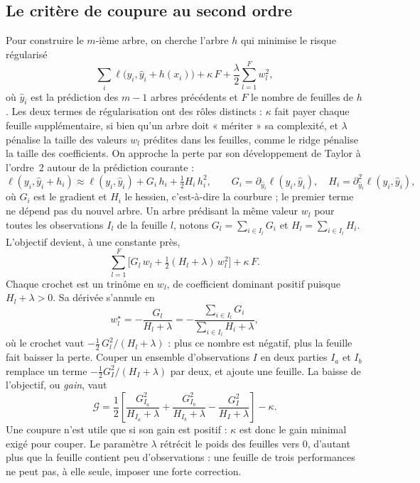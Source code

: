 \documentclass[11pt,a4paper]{article}
\begin{document}
\subsection{Le critère de coupure au second ordre}\label{sec:critere_coupure}

Pour construire le $m$-ième arbre, on cherche l'arbre $h$ qui minimise le risque régularisé
\[
\sum_i \ell\big(y_i, \hat y_i + h(x_i)\big) + \kappa\,F + \frac{\lambda}{2}\sum_{l=1}^F w_l^2,
\]
où $\hat y_i$ est la prédiction des $m - 1$ arbres précédents et $F$ le nombre de feuilles de $h$. Les deux termes
de régularisation ont des rôles distincts : $\kappa$ fait payer chaque feuille supplémentaire, si bien qu'un arbre
doit « mériter » sa complexité, et $\lambda$ pénalise la taille des valeurs $w_l$ prédites dans les feuilles, comme
le ridge pénalise la taille des coefficients. On approche la perte par son développement de Taylor à l'ordre~2 autour
de la prédiction courante \citep{chen2016} :
\[
\ell(y_i, \hat y_i + h_i) \approx \ell(y_i, \hat y_i) + G_i\,h_i + \tfrac12 H_i\,h_i^2,
\qquad G_i = \partial_{\hat y_i}\ell(y_i, \hat y_i),\quad H_i = \partial^2_{\hat y_i}\ell(y_i, \hat y_i),
\]
où $G_i$ est le gradient et $H_i$ le hessien, c'est-à-dire la courbure ; le premier terme ne dépend pas du nouvel
arbre. Un arbre prédisant la même valeur $w_l$ pour toutes les observations $I_l$ de la feuille $l$, notons
$G_l = \sum_{i \in I_l} G_i$ et $H_l = \sum_{i \in I_l} H_i$. L'objectif devient, à une constante près,
\[
\sum_{l=1}^F \Big[G_l\,w_l + \tfrac12 (H_l + \lambda)\,w_l^2\Big] + \kappa\,F .
\]
Chaque crochet est un trinôme en $w_l$, de coefficient dominant positif puisque $H_l + \lambda > 0$. Sa dérivée
s'annule en
\begin{equation}\label{eq:poids_feuille}
w_l^\star = -\frac{G_l}{H_l + \lambda} = -\frac{\sum_{i\in I_l} G_i}{\sum_{i\in I_l} H_i + \lambda},
\end{equation}
où le crochet vaut $-\frac12\,G_l^2/(H_l + \lambda)$ : plus ce nombre est négatif, plus la feuille fait baisser la
perte. Couper un ensemble d'observations $I$ en deux parties $I_a$ et $I_b$ remplace un terme
$-\frac12 G_I^2/(H_I + \lambda)$ par deux, et ajoute une feuille. La baisse de l'objectif, ou \emph{gain}, vaut
\begin{equation}\label{eq:gain}
\mathcal G = \frac12\left[\frac{G_{I_a}^2}{H_{I_a} + \lambda} + \frac{G_{I_b}^2}{H_{I_b} + \lambda}
- \frac{G_{I}^2}{H_{I} + \lambda}\right] - \kappa .
\end{equation}
Une coupure n'est utile que si son gain est positif : $\kappa$ est donc le gain minimal exigé pour couper. Le
paramètre $\lambda$ rétrécit le poids des feuilles vers 0, d'autant plus que la feuille contient peu d'observations :
une feuille de trois performances ne peut pas, à elle seule, imposer une forte correction.
\end{document}
